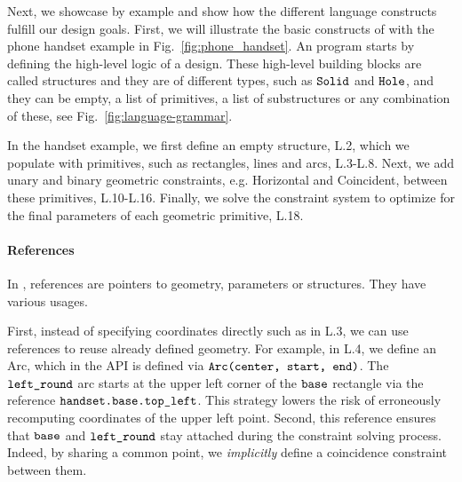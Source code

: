 \begin{figure*}[!ht]
\caption{AIDL allows LLMs to express constraints using semantically meaningful operators. This figure demonstrates how adding constraints (highlighted in red) in an AIDL program for a phone handset eliminates geometrical flaws in the generated 2D sketch. 
(\textbf{Left}) \langname{} code for handset design.
(\textbf{Top right}) Design before constraints applied.
(\textbf{Bottom right}) Design after constraints applied.}
\label{fig:phone_handset}
\end{figure*}

Next, we showcase \langname{} by example and show how the different language constructs fulfill our design goals. First, we will illustrate the basic constructs of \langname{} with the phone handset example in Fig.~\ref{fig:phone_handset}.
An \langname{} program starts by defining the high-level logic of a design.
These high-level building blocks are called structures and they are of different types, such as $\verb|Solid|$ and $\verb|Hole|$, and they can be empty, a list of primitives, a list of substructures or any combination of these, see Fig.~\ref{fig:language-grammar}.

In the handset example, we first define an empty structure, L.2, which we populate with primitives, such as rectangles, lines and arcs, L.3-L.8.
Next, we add unary and binary geometric constraints, e.g. Horizontal and Coincident, between these primitives, L.10-L.16.
Finally, we solve the constraint system to optimize for the final parameters of each geometric primitive, L.18.

\paragraph{References}
In \langname{}, references are pointers to geometry, parameters or structures. They have various usages.

First, instead of specifying coordinates directly such as in L.3, we can use references to reuse already defined geometry.
For example, in L.4, we define an Arc, which in the \langname{} API is defined via $\verb|Arc(center, start, end)|$.
The $\verb|left_round|$ arc starts at the upper left corner of the $\verb|base|$ rectangle via the reference $\verb|handset.base.top_left|$.
This strategy lowers the risk of erroneously recomputing coordinates of the upper left point.
Second, this reference ensures that $\verb|base|$ and $\verb|left_round|$ stay attached during the constraint solving process.
Indeed, by sharing a common point, we \emph{implicitly} define a coincidence constraint between them.

